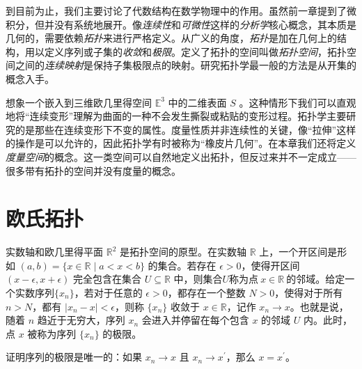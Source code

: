 到目前为止，我们主要讨论了代数结构在数学物理中的作用。虽然前一章提到了微积分，但并没有系统地展开。像\emph{连续性}和\emph{可微性}这样的\emph{分析学}核心概念，其本质是几何的，需要依赖\emph{拓扑}来进行严格定义。从广义的角度，\emph{拓扑}是加在几何上的结构，用以定义序列或子集的\emph{收敛}和\emph{极限}。定义了拓扑的空间叫做\emph{拓扑空间}，拓扑空间之间的\emph{连续映射}是保持子集极限点的映射。研究拓扑学最一般的方法是从开集的概念入手。

想象一个嵌入到三维欧几里得空间 $\mathbb{E}^{3}$ 中的二维表面 $S$ 。这种情形下我们可以直观地将“连续变形”理解为曲面的一种不会发生撕裂或粘贴的变形过程。拓扑学主要研究的是那些在连续变形下不变的属性。度量性质并非连续性的关键，像“拉伸”这样的操作是可以允许的，因此拓扑学有时被称为“橡皮片几何”。在本章我们还将定义\emph{度量空间}的概念。这一类空间可以自然地定义出拓扑，但反过来并不一定成立——很多带有拓扑的空间并没有度量的概念。

\section{欧氏拓扑}

实数轴和欧几里得平面 $\mathbb{R}^{2}$ 是拓扑空间的原型。在实数轴 $\mathbb{R}$ 上，一个开区间是形如 $(a,b)=\{x\in \mathbb{R} \mid a< x< b\}$ 的集合。若存在 $\epsilon  >0$，使得开区间 $(x-\epsilon ,x+\epsilon )$ 完全包含在集合 $U\subseteq \mathbb{R}$ 中，则集合$U$称为点$\ x\in \mathbb{R} \ $的邻域。给定一个实数序列$\{x_{n} \}$，若对于任意的 $\epsilon  >0$，都存在一个整数 $N >0$，使得对于所有 $n >N$，都有 $|x_{n} -x|< \epsilon $，则称 $\{x_{n} \}$ 收敛于 $x\in \mathbb{R}$，记作 $x_{n}\rightarrow x$。也就是说，随着 $ n$ 趋近于无穷大，序列 $x_{n}$ 会进入并停留在每个包含 $x$ 的邻域 $U$ 内。此时，点 $x$ 被称为序列 $\{x_{n} \}$ 的极限。

\begin{exercise}
    证明序列的极限是唯一的：如果 $x_{n}\rightarrow x$ 且 $x_{n}\rightarrow x^{\prime}$，那么 $x=x^{\prime}$。
\end{exercise}

